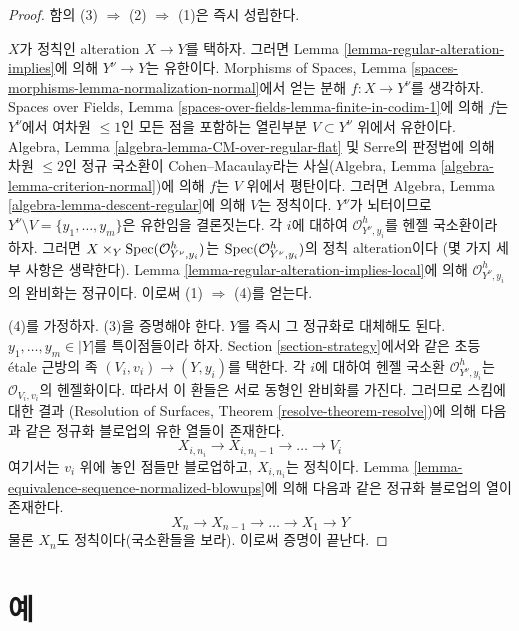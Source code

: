 \begin{proof}
함의 (3) $\Rightarrow$ (2) $\Rightarrow$ (1)은 즉시 성립한다.

\medskip\noindent
$X$가 정칙인 alteration $X \to Y$를 택하자.
그러면 Lemma \ref{lemma-regular-alteration-implies}에 의해
$Y^\nu \to Y$는 유한이다.
Morphisms of Spaces, Lemma
\ref{spaces-morphisms-lemma-normalization-normal}에서 얻는 분해
$f : X \to Y^\nu$를 생각하자.
Spaces over Fields, Lemma
\ref{spaces-over-fields-lemma-finite-in-codim-1}에 의해 $f$는
$Y^\nu$에서 여차원 $\leq 1$인 모든 점을 포함하는 열린부분
$V \subset Y^\nu$ 위에서 유한이다.
Algebra, Lemma \ref{algebra-lemma-CM-over-regular-flat} 및
Serre의 판정법에 의해 차원 $\leq 2$인 정규 국소환이
Cohen--Macaulay라는 사실(Algebra, Lemma
\ref{algebra-lemma-criterion-normal})에 의해 $f$는 $V$ 위에서 평탄이다.
그러면 Algebra, Lemma \ref{algebra-lemma-descent-regular}에 의해
$V$는 정칙이다. $Y^\nu$가 뇌터이므로
$Y^\nu \setminus V = \{y_1, \ldots, y_m\}$은 유한임을 결론짓는다.
각 $i$에 대하여 $\mathcal{O}_{Y^\nu, y_i}^h$를 헨젤 국소환이라 하자.
그러면 $X \times_Y \mathop{\mathrm{Spec}}(\mathcal{O}_{Y^\nu, y_i}^h)$는
$\mathop{\mathrm{Spec}}(\mathcal{O}_{Y^\nu, y_i}^h)$의 정칙 alteration이다
(몇 가지 세부 사항은 생략한다).
Lemma \ref{lemma-regular-alteration-implies-local}에 의해
$\mathcal{O}_{Y^\nu, y_i}^h$의 완비화는 정규이다.
이로써 (1) $\Rightarrow$ (4)를 얻는다.

\medskip\noindent
(4)를 가정하자. (3)을 증명해야 한다.
$Y$를 즉시 그 정규화로 대체해도 된다.
$y_1, \ldots, y_m \in |Y|$를 특이점들이라 하자.
Section \ref{section-strategy}에서와 같은 초등 \'etale 근방의 족
$(V_i, v_i) \to (Y, y_i)$를 택한다.
각 $i$에 대하여 헨젤 국소환 $\mathcal{O}_{Y^\nu, y_i}^h$는
$\mathcal{O}_{V_i, v_i}$의 헨젤화이다.
따라서 이 환들은 서로 동형인 완비화를 가진다.
그러므로 스킴에 대한 결과
(Resolution of Surfaces, Theorem \ref{resolve-theorem-resolve})에 의해
다음과 같은 정규화 블로업의 유한 열들이 존재한다.
$$
X_{i, n_i} \to X_{i, n_i - 1} \to \ldots \to V_i
$$
여기서는 $v_i$ 위에 놓인 점들만 블로업하고,
$X_{i, n_i}$는 정칙이다.
Lemma \ref{lemma-equivalence-sequence-normalized-blowups}에 의해
다음과 같은 정규화 블로업의 열이 존재한다.
$$
X_n \to X_{n - 1} \to \ldots \to X_1 \to Y
$$
물론 $X_n$도 정칙이다(국소환들을 보라).
이로써 증명이 끝난다.
\end{proof}





\section{예}
\label{section-examples}

